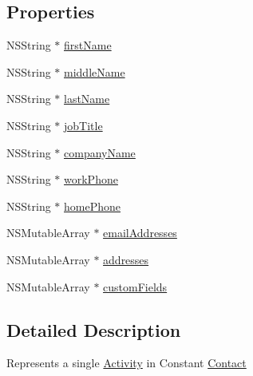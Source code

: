 \subsection*{Properties}
\begin{DoxyCompactItemize}
\item 
N\-S\-String $\ast$ \hyperlink{interface_add_contacts_import_data_adb19c403a4abd271156a99dc0637ddc2}{first\-Name}
\item 
N\-S\-String $\ast$ \hyperlink{interface_add_contacts_import_data_a9b2b6cb080ea28ad7fab14029efcadbc}{middle\-Name}
\item 
N\-S\-String $\ast$ \hyperlink{interface_add_contacts_import_data_a375331c67e7bf7d4afde74ae1f223e00}{last\-Name}
\item 
N\-S\-String $\ast$ \hyperlink{interface_add_contacts_import_data_a6d159f3a0da37dc4f87b67f001ad5b00}{job\-Title}
\item 
N\-S\-String $\ast$ \hyperlink{interface_add_contacts_import_data_a6dfe6c55c01be367f826863baa06a8df}{company\-Name}
\item 
N\-S\-String $\ast$ \hyperlink{interface_add_contacts_import_data_a00262e9fa1de536c3154762383b0d575}{work\-Phone}
\item 
N\-S\-String $\ast$ \hyperlink{interface_add_contacts_import_data_a98ffb23b2ac042fe31771504e3cdc75a}{home\-Phone}
\item 
N\-S\-Mutable\-Array $\ast$ \hyperlink{interface_add_contacts_import_data_af4f52fc9be83a9e8f460d58ab58aee21}{email\-Addresses}
\item 
N\-S\-Mutable\-Array $\ast$ \hyperlink{interface_add_contacts_import_data_aa5449087ac359f2b95f37aadf965bdca}{addresses}
\item 
N\-S\-Mutable\-Array $\ast$ \hyperlink{interface_add_contacts_import_data_a2339c1b556a65c1219eee18390f87cd8}{custom\-Fields}
\end{DoxyCompactItemize}


\subsection{Detailed Description}
Represents a single \hyperlink{interface_activity}{Activity} in Constant \hyperlink{interface_contact}{Contact} 

